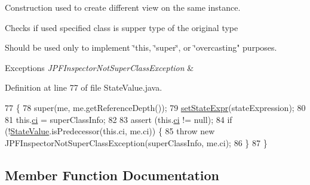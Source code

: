 Construction used to create different view on the same instance. 

Checks if used specified class is supper type of the original type

Should be used only to implement \char`\"{}this, \char`\"{}super\char`\"{}, or \char`\"{}overcasting" purposes.


\begin{DoxyExceptions}{Exceptions}
{\em J\+P\+F\+Inspector\+Not\+Super\+Class\+Exception} & \\
\hline
\end{DoxyExceptions}


Definition at line 77 of file State\+Value.\+java.


\begin{DoxyCode}
77                                                                                                            
                              \{
78     super(me, me.getReferenceDepth());
79     \hyperlink{classgov_1_1nasa_1_1jpf_1_1inspector_1_1server_1_1programstate_1_1_state_node_a7ed75cc4ba543123c95e506db6f7b84c}{setStateExpr}(stateExpression);
80 
81     this.\hyperlink{classgov_1_1nasa_1_1jpf_1_1inspector_1_1server_1_1programstate_1_1_state_value_a0eb4aa1e630ed6372dcfb8c41ae7edc5}{ci} = superClassInfo;
82 
83     assert (this.\hyperlink{classgov_1_1nasa_1_1jpf_1_1inspector_1_1server_1_1programstate_1_1_state_value_a0eb4aa1e630ed6372dcfb8c41ae7edc5}{ci} != null);
84     \textcolor{keywordflow}{if} (!\hyperlink{classgov_1_1nasa_1_1jpf_1_1inspector_1_1server_1_1programstate_1_1_state_value_aef9d3691f1dd70f6458c47ce8bc6943c}{StateValue}.isPredecessor(\textcolor{keyword}{this}.ci, me.ci)) \{
85       \textcolor{keywordflow}{throw} \textcolor{keyword}{new} JPFInspectorNotSuperClassException(superClassInfo, me.ci);
86     \}
87   \}
\end{DoxyCode}


\subsection{Member Function Documentation}

